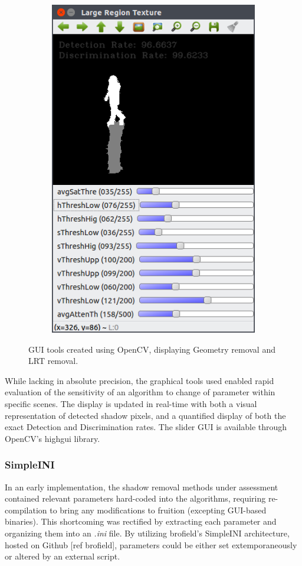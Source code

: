 \documentclass[12pt]{report}
\begin{document}
\begin{figure}
\begin{subfigure}{.49\linewidth}
  \includegraphics[width=.7\linewidth]{figures/lr_caviar_default.png}
  \label{fig:sub2}
\end{subfigure}
\caption{GUI tools created using OpenCV, displaying Geometry removal and LRT removal.}
\label{fig:guitools}
\end{figure}

While lacking in absolute precision, the graphical tools used enabled rapid evaluation of the sensitivity of an algorithm to change of parameter within specific scenes. The display is updated in real-time with both a visual representation of detected shadow pixels, and a quantified display of both the exact Detection and Discrimination rates. The slider GUI is available through OpenCV's highgui library.

\subsubsection{SimpleINI}
In an early implementation, the shadow removal methods under assessment contained relevant parameters hard-coded into the algorithms, requiring re-compilation to bring any modifications to fruition (excepting GUI-based binaries). This shortcoming was rectified by extracting each parameter and organizing them into an \textit{.ini} file. By utilizing brofield's SimpleINI architecture, hosted on Github [ref brofield], parameters could be either set extemporaneously or altered by an external script. 
\end{document}
